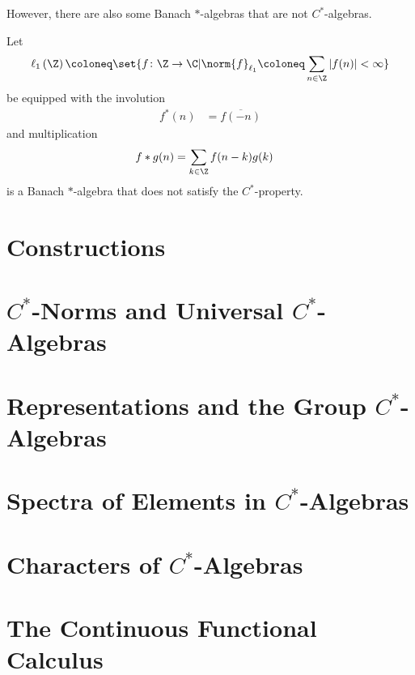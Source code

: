 However, there are also some Banach $\ast$-algebras that are not $C^{\ast}$-algebras.
\begin{example}
  Let 
  \begin{align*}
    \ell_1\left( \Z \right)\coloneq \set{f\colon \Z\rightarrow\C | \norm{f}_{\ell_1} \coloneq \sum_{n\in\Z}\left\vert f(n) \right\vert < \infty}
  \end{align*}
  be equipped with the involution
  \begin{align*}
    f^{\ast}\left( n \right) &= \overline{f\left( -n \right)}
  \end{align*}
  and multiplication
  \begin{align*}
    f\ast g(n) &= \sum_{k\in\Z}f(n-k)g(k)
  \end{align*}
  is a Banach $\ast$-algebra that does not satisfy the $C^{\ast}$-property.
\end{example}
\section{Constructions}%
\section{$C^{\ast}$-Norms and Universal $C^{\ast}$-Algebras}%
\section{Representations and the Group $C^{\ast}$-Algebras}%
\section{Spectra of Elements in $C^{\ast}$-Algebras}%
\section{Characters of $C^{\ast}$-Algebras}%
\section{The Continuous Functional Calculus}%
